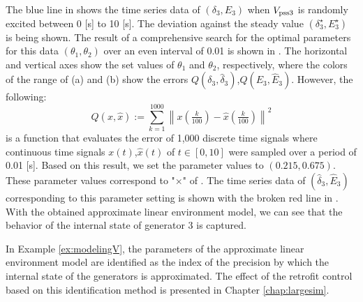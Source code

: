 \documentclass[tombow,dvipdfmx]{corona-a5-1.1}
\begin{document}
\begin{例}

The blue line in  shows the time series data of $(\delta_3,E_3)$ when $V_{{\rm pss}3}$ is randomly excited between 0 [s] to 10 [s].
The deviation against the steady value $(\delta_3^{\star},E_3^{\star})$ is being shown.
The result of a comprehensive search for the optimal parameters for this data $(\theta_1,\theta_2)$ over an even interval of 0.01 is shown in .
The horizontal and vertical axes show the set values of $\theta_1$ and $\theta_2$, respectively, where the colors of the range of (a) and (b) show the errors $Q(\delta_3,\hat{\delta}_3)$,$Q(E_3,\hat{E}_3)$.
However, the following:
\[
Q(x,\hat{x}):=
\sum_{k=1}^{1000}
\left\|
x\left(
\tfrac{k}{100}
\right)
-
\hat{x}\left(
\tfrac{k}{100}
\right)
\right\|^2
\]
is a function that evaluates the error of 1,000 discrete time signals where continuous time signals $x(t)$,$\hat{x}(t)$ of $t\in [0,10]$ were sampled over a period of 0.01 [s].
Based on this result, we set the parameter values to $(0.215,0.675)$.
These parameter values correspond to "$\times$" of .
The time series data of $(\hat{\delta}_3,\hat{E}_3)$ corresponding to this parameter setting is shown with the broken red line in .
With the obtained approximate linear environment model, we can see that the behavior of the internal state of generator 3 is captured.
\end{例}


In Example \ref{ex:modelingV}, the parameters of the approximate linear environment model are identified as the index of the precision by which the internal state of the generators is approximated.
The effect of the retrofit control based on this identification method is presented in Chapter \ref{chap:largesim}.

\newpage
%
%
\end{document}
